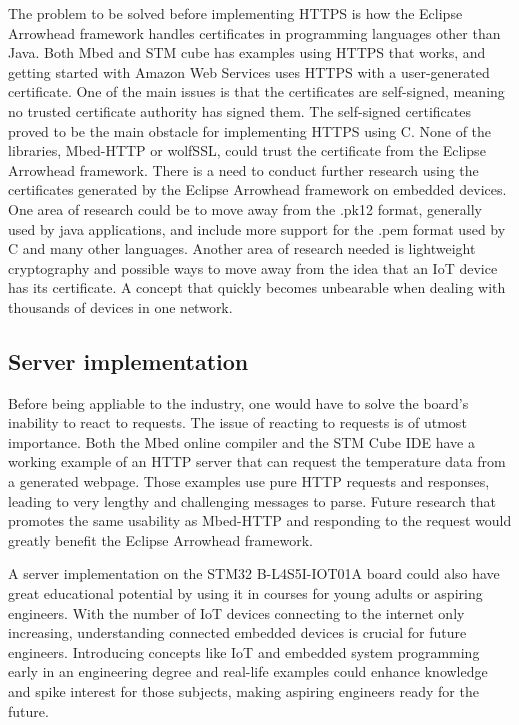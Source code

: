The problem to be solved before implementing HTTPS is how the Eclipse Arrowhead framework handles certificates in programming languages other than Java.
Both Mbed and STM cube has examples using HTTPS that works, and getting started with Amazon Web Services uses HTTPS with a user-generated certificate.
One of the main issues is that the certificates are self-signed, meaning no trusted certificate authority has signed them. 
The self-signed certificates proved to be the main obstacle for implementing HTTPS using C. None of the libraries, Mbed-HTTP or wolfSSL, could trust the certificate from the Eclipse Arrowhead framework.
There is a need to conduct further research using the certificates generated by the Eclipse Arrowhead framework on embedded devices.
One area of research could be to move away from the .pk12 format, generally used by java applications, and include more support for the .pem format used by C and many other languages.
Another area of research needed is lightweight cryptography and possible ways to move away from the idea that an IoT device has its certificate.
A concept that quickly becomes unbearable when dealing with thousands of devices in one network.

\subsection{Server implementation}
Before being appliable to the industry, one would have to solve the board's inability to react to requests. 
The issue of reacting to requests is of utmost importance. 
Both the Mbed online compiler and the STM Cube IDE have a working example of an HTTP server that can request the temperature data from a generated webpage.
Those examples use pure HTTP requests and responses, leading to very lengthy and challenging messages to parse. 
Future research that promotes the same usability as Mbed-HTTP and responding to the request would greatly benefit the Eclipse Arrowhead framework.  

A server implementation on the STM32 B-L4S5I-IOT01A board could also have great educational potential by using it in courses for young adults or aspiring engineers.
With the number of IoT devices connecting to the internet only increasing, understanding connected embedded devices is crucial for future engineers. 
Introducing concepts like IoT and embedded system programming early in an engineering degree and real-life examples could enhance knowledge and spike interest for those subjects, making aspiring engineers ready for the future.  
